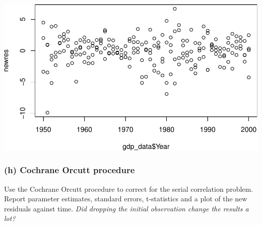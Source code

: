 \documentclass[11pt,]{article}
\newenvironment{Shaded}{\begin{snugshade}}{\end{snugshade}}
\newcommand{\KeywordTok}[1]{\textcolor[rgb]{0.13,0.29,0.53}{\textbf{#1}}}
\newcommand{\OperatorTok}[1]{\textcolor[rgb]{0.81,0.36,0.00}{\textbf{#1}}}
\newcommand{\NormalTok}[1]{#1}
\begin{document}
\begin{Shaded}
\end{Shaded}

\includegraphics{ps4_code_files/figure-latex/plot PW results-1.pdf}

\subsubsection{(h) Cochrane Orcutt
procedure}\label{h-cochrane-orcutt-procedure}

Use the Cochrane Orcutt procedure to correct for the serial correlation
problem. Report parameter estimates, standard errors, t-statistics and a
plot of the new residuals against time. \emph{Did dropping the initial
observation change the results a lot?}
\end{document}
